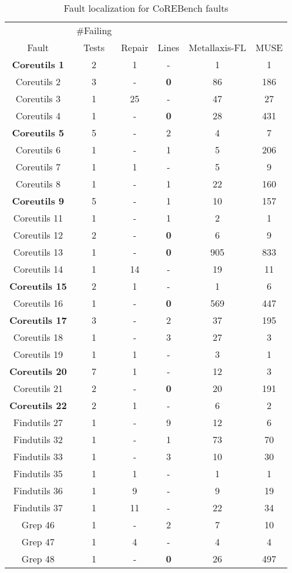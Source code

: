 \begin{table}
\caption{Fault localization for CoREBench faults}
\centering
{\scriptsize
\begin{tabular}{|c|c||c|c||c|c|}
\hline
& \#Failing & & & & \\
Fault & Tests & Repair & Lines & Metallaxis-FL & MUSE\\
\hline
{\bf Coreutils 1} & 2 & 1 & - & 1 & 1 \\
Coreutils 2 & 3 & - &  {\bf 0} & 86 & 186 \\
Coreutils 3 & 1 & 25 & - & 47 & 27 \\
Coreutils 4 & 1 & - &  {\bf 0} & 28 & 431 \\
{\bf Coreutils 5} & 5 & - &  2 & 4 & 7 \\
Coreutils 6 & 1 & - &  1 & 5 & 206 \\
Coreutils 7 & 1 & 1 & - & 5 & 9 \\
Coreutils 8 & 1 & - &  1 & 22 & 160 \\
{\bf Coreutils 9} & 5 & - &  1 & 10 & 157 \\
Coreutils 11 & 1 & - &  1 & 2 & 1 \\
Coreutils 12 & 2 & - & {\bf 0} & 6 & 9 \\
Coreutils 13 & 1 & - & {\bf 0} & 905 & 833 \\
Coreutils 14 & 1 & 14 & - & 19 & 11 \\
{\bf Coreutils 15} & 2 & 1 & - & 1 & 6 \\
Coreutils 16 & 1 & - & {\bf 0} & 569 & 447 \\
{\bf Coreutils 17} & 3 & - &  2 & 37 & 195 \\
Coreutils 18 & 1 & - &  3 & 27 & 3 \\
Coreutils 19 & 1 & 1 & - & 3 & 1 \\
{\bf Coreutils 20} & 7 & 1 & - & 12 & 3 \\
Coreutils 21 & 2 & - & {\bf 0} & 20 & 191 \\
{\bf Coreutils 22} & 2 & 1 & - & 6 & 2 \\
Findutils 27 & 1 & - &  9 & 12 & 6 \\
Findutils 32 & 1 & - &  1 & 73 & 70 \\
Findutils 33 & 1 & - &  3 & 10 & 30 \\
Findutils 35 & 1 & 1 & - & 1 & 1 \\
Findutils 36 & 1 & 9 & - & 9 & 19 \\
Findutils 37 & 1 & 11 & - & 22 & 34 \\
Grep 46 & 1 & - &  2 & 7 & 10 \\
Grep 47 & 1 & 4 & - & 4 & 4 \\
Grep 48 & 1 & - & {\bf 0} & 26 & 497 \\

\hline
\end{tabular}
}
\label{otherbugs}
\end{table}